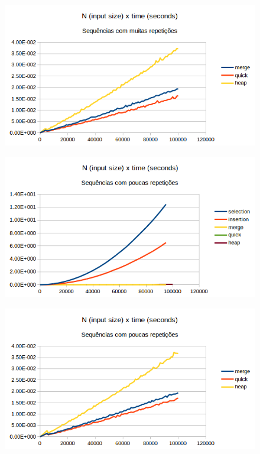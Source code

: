 \documentclass[11pt,a4paper]{article}
\begin{document}
\begin{figure}[]
  \begin{center}
      \includegraphics[width=1\textwidth]{lotrept_zoom}
  \end{center}
      \label{fig:h}
\end{figure}

\begin{figure}[]
  \begin{center}
      \includegraphics[width=1\textwidth]{fewrept}
  \end{center}
      \label{fig:i}
\end{figure}

\begin{figure}[]
  \begin{center}
      \includegraphics[width=1\textwidth]{fewrept_zoom}
  \end{center}
      \label{fig:j}
\end{figure}
\end{document}
